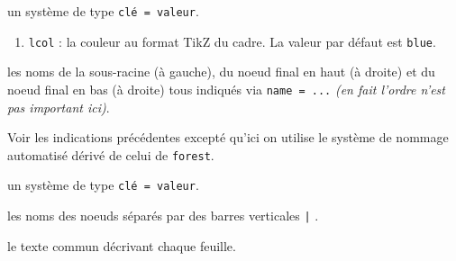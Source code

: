 \documentclass[12pt,a4paper]{article}
\begin{document}


\separation


 \hfill {}

\IDoption{} un système de type \texttt{clé = valeur}.

\begin{enumerate}
    \item \verb#lcol# : la couleur au format TikZ du cadre. La valeur par défaut est \verb#blue#.
\end{enumerate}


 les noms de la sous-racine (à gauche), du noeud final en haut (à droite) et du noeud final en bas (à droite) tous indiqués via \verb#name = ...# \emph{(en fait l'ordre n'est pas important ici)}.


\bigskip


 \hfill {}

\extraspace
\extraspace

Voir les indications précédentes excepté qu'ici on utilise le système de nommage automatisé dérivé de celui de \verb#forest#.





\separation




\IDoption{} un système de type \texttt{clé = valeur}.


 les noms des noeuds séparés par des barres verticales \verb#|# .

 le texte commun décrivant chaque feuille.


\bigskip
\end{document}
